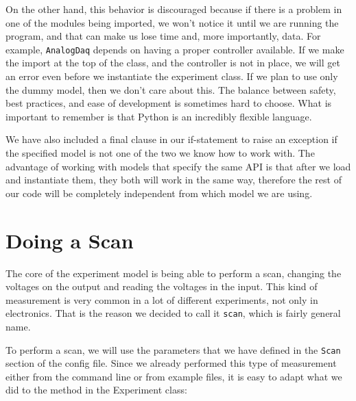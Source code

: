 On the other hand, this behavior is discouraged because if there is a problem in one of the modules being imported, we won't notice it until we are running the program, and that can make us lose time and, more importantly, data. For example, \texttt{AnalogDaq} depends on having a proper controller available. If we make the import at the top of the class, and the controller is not in place, we will get an error even before we instantiate the experiment class. If we plan to use only the dummy model, then we don't care about this. The balance between safety, best practices, and ease of development is sometimes hard to choose. What is important to remember is that Python is an incredibly flexible language. 

We have also included a final clause in our if-statement to raise an exception if the specified model is not one of the two we know how to work with. The advantage of working with models that specify the same API is that after we load and instantiate them, they both will work in the same way, therefore the rest of our code will be completely independent from which model we are using. 


\section{Doing a Scan}\label{section:doing-scan}
The core of the experiment model is being able to perform a scan, changing the voltages on the output and reading the voltages in the input. This kind of measurement is very common in a lot of different experiments, not only in electronics. That is the reason we decided to call it \texttt{scan}, which is fairly general name. 


To perform a scan, we will use the parameters that we have defined in the \texttt{Scan} section of the config file. Since we already performed this type of measurement either from the command line or from example files, it is easy to adapt what we did to the method in the Experiment class:

